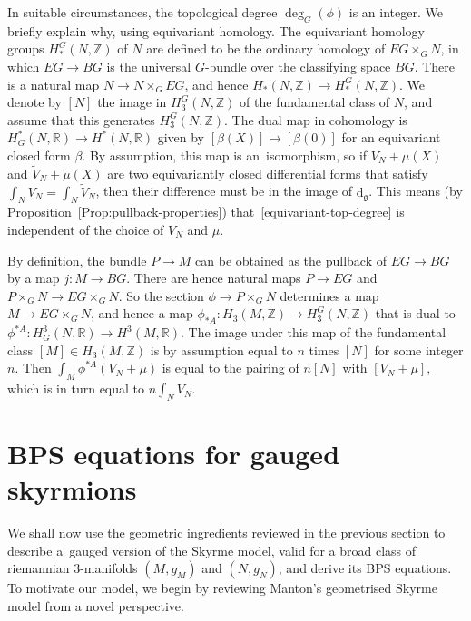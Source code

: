 \documentclass[10pt,a4paper]{amsart}
\newcommand{\g}{{\mathfrak{g}}}
\newcommand{\R}{{\mathbb{R}}}
\newcommand{\Z}{{\mathbb{Z}}}
\newcommand{\1}{{\mathbb{1}}}
\def \d{\mathrm{d}}
\numberwithin{equation}{section}
\begin{document}
In suitable circumstances, the topological degree $\deg_G(\phi)$ is an integer. We briefly explain why, using equivariant homology. The equivariant homology groups $H^G_\ast(N,\Z)$ of $N$ are defined to be the ordinary homology of $EG\times_G N$, in which $EG\to BG$ is the universal $G$-bundle over the classifying space $BG$. There is a natural map $N\to N\times_G EG$, and hence $H_\ast(N,\Z)\to H^G_\ast(N,\Z)$. We denote by $[N]$ the image in $H^G_3(N,\Z)$ of the fundamental class of $N$, and assume that this generates $H^G_3(N,\Z)$. The dual map in cohomology is $H^\ast_G(N,\R)\to H^\ast(N,\R)$ given by $[\beta(X)]\mapsto[\beta(0)]$ for an equivariant closed form $\beta$. By assumption, this map is an~isomorphism, so if $V_N+\mu(X)$ and $\tilde{V}_N+\tilde{\mu}(X)$ are two equivariantly closed differential forms that satisfy $\int_NV_N=\int_N\tilde{V}_N$, then their difference must be in the image of $\d_\g$. This means (by Proposition~\ref{Prop:pullback-properties}) that~\eqref{equivariant-top-degree} is independent of the choice of $V_N$ and $\mu$.

By definition, the bundle $P\to M$ can be obtained as the pullback of $EG\to BG$ by a map $j\colon M\to BG$. There are hence natural maps $P\to EG$ and $P\times_G N \to EG\times_G N$. So the section $\phi\to P\times_G N$ determines a map $M\to EG\times_G N$, and hence a map $\phi_{\ast A}\colon H_3(M,\Z)\to H_3^G(N,\Z)$ that is dual to $\phi^{\ast A}\colon H^3_G(N,\R)\to H^3(M,\R)$. The image under this map of the fundamental class $[M]\in H_3(M,\Z)$ is by assumption equal to $n$ times $[N]$ for some integer $n$. Then $\int_M\phi^{\ast A}(V_N+\mu)$ is equal to the pairing of $n[N]$ with $[V_N+\mu]$, which is in turn equal to $n\int_N V_N$.

\section{BPS equations for gauged skyrmions}\label{sec:BPS-eqns}
We shall now use the geometric ingredients reviewed in the previous section to describe a~gauged version of the Skyrme model, valid for a broad class of riemannian 3-manifolds $(M,g_M)$ and $(N,g_N)$, and derive its BPS equations. To motivate our model, we begin by reviewing Manton's geometrised Skyrme model \cite{Manton1987geometry} from a novel perspective.
\end{document}
